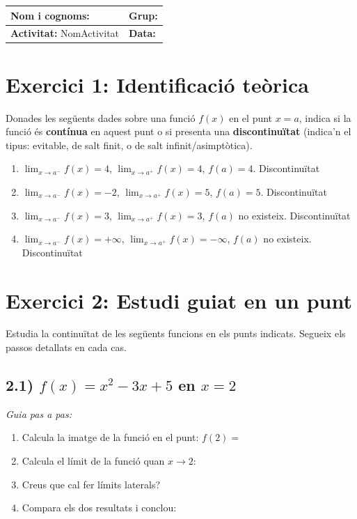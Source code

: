 \documentclass[12pt,a4paper]{article}
\begin{document}
\begingroup
\renewcommand{\arraystretch}{2.2}
\begin{tabularx}{\textwidth}{|X|p{4cm}|}
    \hline
    \textbf{Nom i cognoms:} & \textbf{Grup:} \\ \hline
    \textbf{Activitat:} NomActivitat & \textbf{Data:} \\ \hline
\end{tabularx}
\endgroup

\vspace{0.8cm}

\vspace{0.5cm}

\section*{Exercici 1: Identificació teòrica}
Donades les següents dades sobre una funció $f(x)$ en el punt $x=a$, indica si la funció és \textbf{contínua} en aquest punt o si presenta una \textbf{discontinuïtat} (indica'n el tipus: evitable, de salt finit, o de salt infinit/asimptòtica).

\begin{enumerate}[label=\alph*)]
    \item $\lim_{x \to a^-} f(x) = 4$, \quad $\lim_{x \to a^+} f(x) = 4$, \quad $f(a) = 4$. Discontinuïtat  \dotfill
    \item $\lim_{x \to a^-} f(x) = -2$, \quad $\lim_{x \to a^+} f(x) = 5$, \quad $f(a) = 5$. Discontinuïtat  \dotfill
    \item $\lim_{x \to a^-} f(x) = 3$, \quad $\lim_{x \to a^+} f(x) = 3$, \quad $f(a)$ no existeix. Discontinuïtat \dotfill
    \item $\lim_{x \to a^-} f(x) = +\infty$, \quad $\lim_{x \to a^+} f(x) = -\infty$, \quad $f(a)$ no existeix. Discontinuïtat \dotfill
\end{enumerate}

\section*{Exercici 2: Estudi guiat en un punt}
Estudia la continuïtat de les següents funcions en els punts indicats. Segueix els passos detallats en cada cas.

\subsection*{2.1) $f(x) = x^2 - 3x + 5$ \quad en \quad $x=2$}
\textit{Guia pas a pas:}
\begin{enumerate}
    \item Calcula la imatge de la funció en el punt: $f(2) = $
    \item Calcula el límit de la funció quan $x \to 2$:
    \item Creus que cal fer límits laterals?
    \item Compara els dos resultats i conclou:
\end{enumerate}
\end{document}

